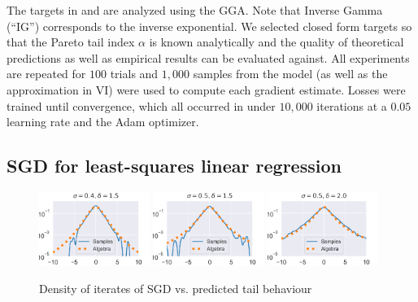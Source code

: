 \documentclass[../thesis.tex]{subfiles}
\begin{document}
The targets in  and  are analyzed using
the GGA. Note that Inverse Gamma (``IG'') corresponds
to the inverse exponential. We selected closed form targets so that
the Pareto tail index $\alpha$ is known analytically and the quality
of theoretical predictions as well as empirical results can be evaluated
against. All experiments are repeated for $100$ trials and $1,000$ samples
from the model (as well as the approximation in VI) were used to compute
each gradient estimate. Losses were trained until convergence, which
all occurred in under $10,000$ iterations at a $0.05$ learning rate and
the Adam \citep{kingma2014adam} optimizer.





\subsection{SGD for least-squares linear regression}

\begin{figure}[ht]
  \centering
  \includegraphics[width=0.32\textwidth]{figures/Kesten_0.40_1.5.png}
  \includegraphics[width=0.32\textwidth]{figures/Kesten_0.50_1.5.png}
  \includegraphics[width=0.32\textwidth]{figures/Kesten_0.50_2.png}
  \caption{\label{fig:SGD}Density of iterates of SGD vs. predicted tail behaviour}
\end{figure}
\end{document}
